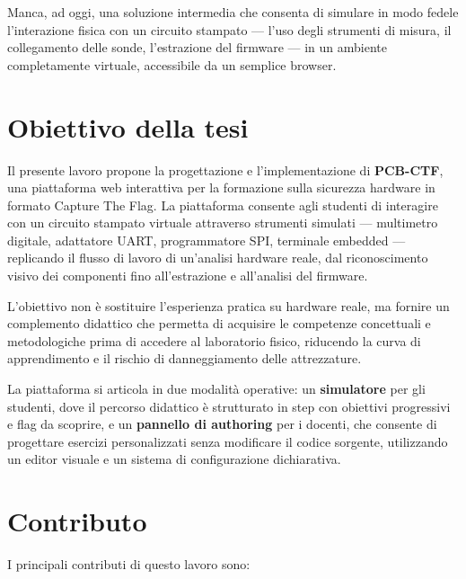 Manca, ad oggi, una soluzione intermedia che consenta di simulare in modo fedele l'interazione fisica con un circuito stampato --- l'uso degli strumenti di misura, il collegamento delle sonde, l'estrazione del firmware --- in un ambiente completamente virtuale, accessibile da un semplice browser.

\section*{Obiettivo della tesi}

Il presente lavoro propone la progettazione e l'implementazione di \textbf{PCB-CTF}, una piattaforma web interattiva per la formazione sulla sicurezza hardware in formato Capture The Flag. La piattaforma consente agli studenti di interagire con un circuito stampato virtuale attraverso strumenti simulati --- multimetro digitale, adattatore UART, programmatore SPI, terminale embedded --- replicando il flusso di lavoro di un'analisi hardware reale, dal riconoscimento visivo dei componenti fino all'estrazione e all'analisi del firmware.

L'obiettivo non è sostituire l'esperienza pratica su hardware reale, ma fornire un complemento didattico che permetta di acquisire le competenze concettuali e metodologiche prima di accedere al laboratorio fisico, riducendo la curva di apprendimento e il rischio di danneggiamento delle attrezzature.

La piattaforma si articola in due modalità operative: un \textbf{simulatore} per gli studenti, dove il percorso didattico è strutturato in step con obiettivi progressivi e flag da scoprire, e un \textbf{pannello di authoring} per i docenti, che consente di progettare esercizi personalizzati senza modificare il codice sorgente, utilizzando un editor visuale e un sistema di configurazione dichiarativa.

\section*{Contributo}

I principali contributi di questo lavoro sono:

